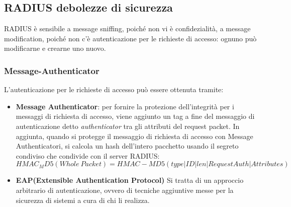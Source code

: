 \documentclass{article}
\theoremstyle{remark}
\begin{document}
\subsection{RADIUS debolezze di sicurezza}
RADIUS è sensibile a message sniffing, poiché non vi è confidezialità, a message modification, poiché non c'è autenticazione per le richieste di accesso: ognuno può modificarne e crearne uno nuovo.
\subsubsection{Message-Authenticator}
L'autenticazione per le richieste di accesso può essere ottenuta tramite:\begin{itemize}
    \item \textbf{Message Authenticator}: per fornire la protezione dell'integrità per i messaggi di richiesta di accesso, viene aggiunto un tag a fine del messaggio di autenticazione detto \emph{authenticator} tra gli attributi del request packet. In aggiunta, quando si protegge il messaggio di richiesta di accesso con Message Authenticatori, si calcola un hash dell'intero pacchetto usando il segreto condiviso che condivide con il server RADIUS:$HMAC_MD5(Whole\ Packet)=HMAC-MD5(type|ID|len|RequestAuth|Attributes)$
    \item \textbf{EAP(Extensible Authentication Protocol)} Si tratta di un approccio arbitrario di autenticazione, ovvero di tecniche aggiuntive messe per la sicurezza di sistemi a cura di chi li realizza.
\end{itemize}
\end{document}
